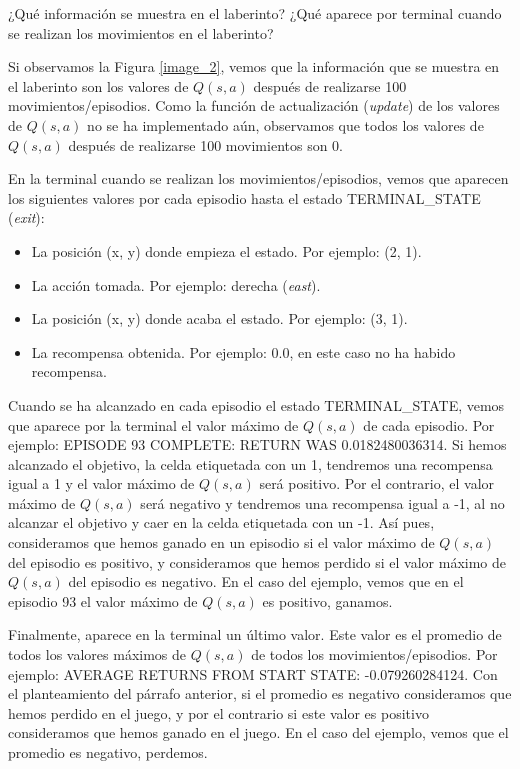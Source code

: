 \documentclass[11pt]{exam}
\begin{document}
\begin{questions}
{ \question ¿Qué información se muestra en el laberinto? ¿Qué aparece por terminal cuando se realizan los movimientos en el laberinto? 
}

Si observamos la Figura \ref{image_2}, vemos que la información que se muestra en el laberinto son los valores de $Q(s,a)$ después de realizarse 100 movimientos/episodios. Como la función de actualización (\textit{update}) de los valores de $Q(s,a)$ no se ha implementado aún, observamos que todos los valores de $Q(s,a)$ después de realizarse 100 movimientos son 0.

En la terminal cuando se realizan los movimientos/episodios, vemos que aparecen los siguientes valores por cada episodio hasta el estado TERMINAL\_STATE (\textit{exit}):

\begin{itemize}
	\item La posición (x, y) donde empieza el estado. Por ejemplo: (2, 1).
	\item La acción tomada. Por ejemplo: derecha (\textit{east}).
	\item La posición (x, y) donde acaba el estado. Por ejemplo: (3, 1).
	\item La recompensa obtenida. Por ejemplo: 0.0, en este caso no ha habido recompensa. 
\end{itemize}

Cuando se ha alcanzado en cada episodio el estado TERMINAL\_STATE, vemos que aparece por la terminal el valor máximo de $Q(s,a)$ de cada episodio. Por ejemplo: EPISODE 93 COMPLETE: RETURN WAS 0.0182480036314. Si hemos alcanzado el objetivo, la celda etiquetada con un 1, tendremos una recompensa igual a 1 y el valor máximo de $Q(s,a)$ será positivo. Por el contrario, el valor máximo de $Q(s,a)$ será negativo y tendremos una recompensa igual a -1, al no alcanzar el objetivo y caer en la celda etiquetada con un -1. Así pues, consideramos que hemos ganado en un episodio si el valor máximo de $Q(s,a)$ del episodio es positivo, y consideramos que hemos perdido si el valor máximo de $Q(s,a)$ del episodio es negativo. En el caso del ejemplo, vemos que en el episodio 93 el valor máximo de $Q(s,a)$ es positivo, ganamos.

Finalmente, aparece en la terminal un último valor. Este valor es el promedio de todos los valores máximos de $Q(s,a)$ de todos los movimientos/episodios. Por ejemplo: AVERAGE RETURNS FROM START STATE: -0.079260284124. Con el planteamiento del párrafo anterior, si el promedio es negativo consideramos que hemos perdido en el juego, y por el contrario si este valor es positivo consideramos que hemos ganado en el juego. En el caso del ejemplo, vemos que el promedio es negativo, perdemos.


\end{questions}
\end{document}

